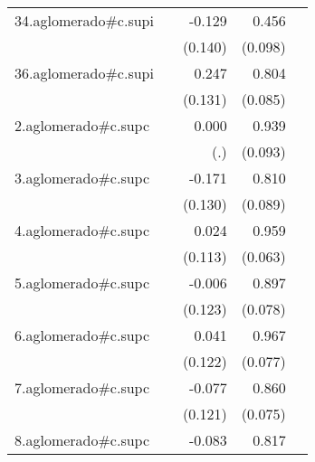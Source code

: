 {\begin{longtable}{l*{4}{D{.}{.}{-1}}}
\addlinespace
34.aglomerado#c.supi&                     &      -0.129         &       0.456\sym{***}&                     \\
            &                     &     (0.140)         &     (0.098)         &                     \\
\addlinespace
36.aglomerado#c.supi&                     &       0.247         &       0.804\sym{***}&                     \\
            &                     &     (0.131)         &     (0.085)         &                     \\
\addlinespace
2.aglomerado#c.supc&                     &       0.000         &       0.939\sym{***}&                     \\
            &                     &         (.)         &     (0.093)         &                     \\
\addlinespace
3.aglomerado#c.supc&                     &      -0.171         &       0.810\sym{***}&                     \\
            &                     &     (0.130)         &     (0.089)         &                     \\
\addlinespace
4.aglomerado#c.supc&                     &       0.024         &       0.959\sym{***}&                     \\
            &                     &     (0.113)         &     (0.063)         &                     \\
\addlinespace
5.aglomerado#c.supc&                     &      -0.006         &       0.897\sym{***}&                     \\
            &                     &     (0.123)         &     (0.078)         &                     \\
\addlinespace
6.aglomerado#c.supc&                     &       0.041         &       0.967\sym{***}&                     \\
            &                     &     (0.122)         &     (0.077)         &                     \\
\addlinespace
7.aglomerado#c.supc&                     &      -0.077         &       0.860\sym{***}&                     \\
            &                     &     (0.121)         &     (0.075)         &                     \\
\addlinespace
8.aglomerado#c.supc&                     &      -0.083         &       0.817\sym{***}&                     \\

\end{longtable}}
